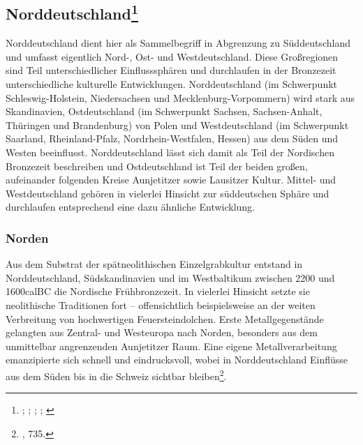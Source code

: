 \documentclass[openany,twoside,twocolumn]{book}
\let\rmarkdownfootnote\footnote%
\def\footnote{\protect\rmarkdownfootnote}
\begin{document}
\hypertarget{norddeutschland}{%
\subsection[Norddeutschland]{\texorpdfstring{Norddeutschland\footnote{\textcite{gorner_bestattungssitten_2002};
  \textcite{hofmann_rituelle_2008}; \textcite{jockenhovel_germany_2013};
  \textcite{jockenhovel_von_2003}; \textcite{schmidt_studien_1993}}}{Norddeutschland}}\label{norddeutschland}}

Norddeutschland dient hier als Sammelbegriff in Abgrenzung zu
Süddeutschland und umfasst eigentlich Nord-, Ost- und Westdeutschland.
Diese Großregionen sind Teil unterschiedlicher Einflusssphären und
durchlaufen in der Bronzezeit unterschiedliche kulturelle Entwicklungen.
Norddeutschland (im Schwerpunkt Schleswig-Holstein, Niedersachsen und
Mecklenburg-Vorpommern) wird stark aus Skandinavien, Ostdeutschland (im
Schwerpunkt Sachsen, Sachsen-Anhalt, Thüringen und Brandenburg) von
Polen und Westdeutschland (im Schwerpunkt Saarland, Rheinland-Pfalz,
Nordrhein-Westfalen, Hessen) aus dem Süden und Westen beeinflusst.
Norddeutschland lässt sich damit als Teil der Nordischen Bronzezeit
beschreiben und Ostdeutschland ist Teil der beiden großen, aufeinander
folgenden Kreise Aunjetitzer sowie Lausitzer Kultur. Mittel- und
Westdeutschland gehören in vielerlei Hinsicht zur süddeutschen Sphäre
und durchlaufen entsprechend eine dazu ähnliche Entwicklung.

\hypertarget{norden}{%
\subsubsection{Norden}\label{norden}}

Aus dem Substrat der spätneolithischen Einzelgrabkultur entstand in
Norddeutschland, Südskandinavien und im Westbaltikum zwischen 2200 und
1600calBC die Nordische Frühbronzezeit. In vielerlei Hinsicht setzte sie
neolithische Traditionen fort -- offensichtlich beispielsweise an der
weiten Verbreitung von hochwertigen Feuersteindolchen. Erste
Metallgegenstände gelangten aus Zentral- und Westeuropa nach Norden,
besonders aus dem unmittelbar angrenzenden Aunjetitzer Raum. Eine eigene
Metallverarbeitung emanzipierte sich schnell und eindrucksvoll, wobei in
Norddeutschland Einflüsse aus dem Süden bis in die Schweiz sichtbar
bleiben\footnote{\textcite{jockenhovel_germany_2013}, 735.}.
\end{document}
